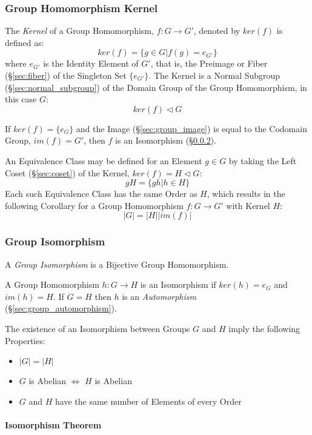 \subsubsection{Group Homomorphism Kernel}\label{sec:group_kernel}

The \emph{Kernel} of a Group Homomorphism, $f : G \rightarrow G'$,
denoted by $ker(f)$ is defined as:
\[
    ker(f) = \{g \in G | f(g) = e_{G'}\}
\]
where $e_{G'}$ is the Identity Element of $G'$, that is, the Preimage
or Fiber (\S\ref{sec:fiber}) of the Singleton Set $\{e_{G'}\}$. The
Kernel is a Normal Subgroup (\S\ref{sec:normal_subgroup}) of the
Domain Group of the Group Homomorphism, in this case $G$:
\[
    ker(f) \triangleleft G
\]

If $ker(f) = \{e_G\}$ and the Image (\S\ref{sec:group_image}) is equal
to the Codomain Group, $im(f) = G'$, then $f$ is an Isomorphism
(\S\ref{sec:group_isomorphism}).

An Equivalence Class may be defined for an Element $g \in G$ by taking
the Left Coset (\S\ref{sec:coset}) of the Kernel, $ker(f) = H
\triangleleft G$:
\[
    gH = \{ gh | h \in H \}
\]
Each such Equivalence Class has the same Order as $H$, which results
in the following Corollary for a Group Homomorphism $f : G \rightarrow
G'$ with Kernel $H$:
\[
    |G| = |H||im(f)|
\]



\subsubsection{Group Isomorphism}\label{sec:group_isomorphism}

A \emph{Group Isomorphism} is a Bijective Group Homomorphism.

A Group Homomorphism $h : G \rightarrow H$ is an Isomorphism if
$ker(h) = e_G$ and $im(h) = H$. If $G = H$ then $h$ is an
\emph{Automorphism} (\S\ref{sec:group_automorphism}).

The existence of an Isomorphism between Groups $G$ and $H$ imply the
following Properties:
\begin{itemize}
    \item $|G| = |H|$
    \item $G$ is Abelian $\Leftrightarrow$ $H$ is Abelian
    \item $G$ and $H$ have the same number of Elements of every Order
\end{itemize}



\paragraph{Isomorphism Theorem}\label{sec:isomorphism_theorem}\hfill

